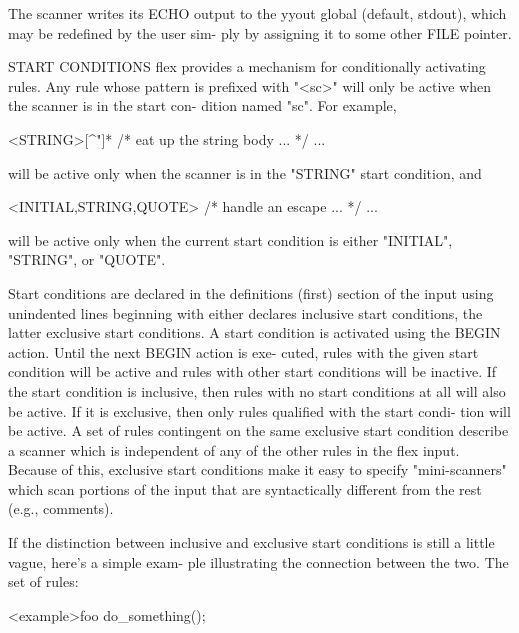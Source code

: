 \documentclass[12pt,spanish,twocolumn,lettersize]{article}
\begin{document}
       The  scanner  writes  its  ECHO output to the yyout global
       (default, stdout), which may be redefined by the user sim-
       ply by assigning it to some other FILE pointer.

START CONDITIONS
       flex  provides  a  mechanism  for conditionally activating
       rules.  Any rule whose pattern  is  prefixed  with  "<sc>"
       will  only be active when the scanner is in the start con-
       dition named "sc".  For example,

	   <STRING>[^"]*	{ /* eat up the string body ... */
		       ...
		       }

       will be active only when the scanner is	in  the	 "STRING"
       start condition, and

	   <INITIAL,STRING,QUOTE>\.	   { /* handle an escape ... */
		       ...
		       }

       will  be	 active	 only when the current start condition is
       either "INITIAL", "STRING", or "QUOTE".

       Start conditions are declared in the  definitions  (first)
       section of the input using unindented lines beginning with
       either %
       declares	 inclusive start conditions, the latter exclusive
       start conditions.  A start condition  is	 activated  using
       the  BEGIN  action.   Until  the next BEGIN action is exe-
       cuted, rules with the given start condition will be active
       and  rules  with	 other start conditions will be inactive.
       If the start condition is inclusive, then  rules	 with  no
       start  conditions  at  all  will also be active.	 If it is
       exclusive, then only rules qualified with the start condi-
       tion  will  be  active.	 A set of rules contingent on the
       same exclusive start condition describe a scanner which is
       independent  of	any of the other rules in the flex input.
       Because of this, exclusive start conditions make	 it  easy
       to  specify  "mini-scanners"  which  scan  portions of the
       input that  are	syntactically  different  from	the  rest
       (e.g., comments).

       If  the	distinction between inclusive and exclusive start
       conditions is still a little vague, here's a simple  exam-
       ple  illustrating the connection between the two.  The set
       of rules:



	   <example>foo	  do_something();
\end{document}
